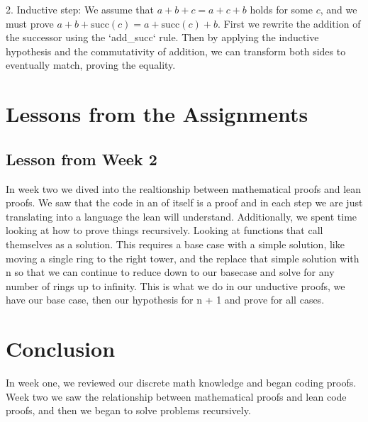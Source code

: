 \documentclass{article}
\begin{document}
2. Inductive step: We assume that \(a + b + c = a + c + b\) holds for some \(c\), and we must prove \(a + b + \text{succ}(c) = a + \text{succ}(c) + b\). First we rewrite the addition of the successor using the `add\_succ` rule. Then by applying the inductive hypothesis and the commutativity of addition, we can transform both sides to eventually match, proving the equality.

\section*{Lessons from the Assignments}
\subsection*{Lesson from Week 2}
In week two we dived into the realtionship between mathematical proofs and lean proofs. We saw that the code in an of itself is a proof and in each step we are just translating into a language the lean will understand. Additionally, we spent time looking at how to prove things recursively. Looking at functions that call themselves as a solution. This requires a base case with a simple solution, like moving a single ring to the right tower, and the replace that simple solution with n so that we can continue to reduce down to our basecase and solve for any number of rings up to infinity. This is what we do in our unductive proofs, we have our base case, then our hypothesis for n + 1 and prove for all cases. 
\section*{Conclusion}
In week one, we reviewed our discrete math knowledge and began coding proofs. Week two we saw the relationship between mathematical proofs and lean code proofs, and then we began to solve problems recursively. 
\end{document}
